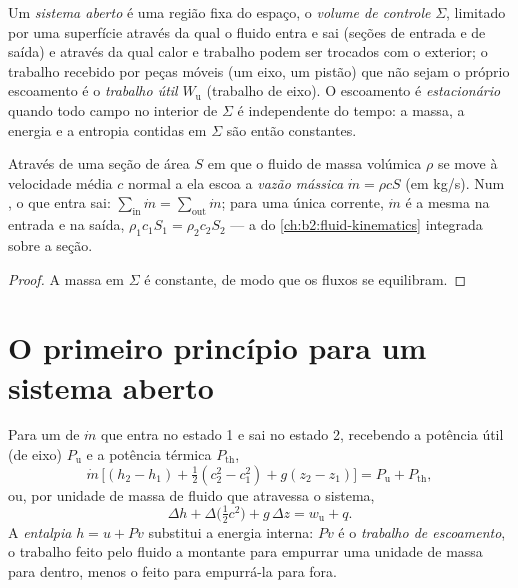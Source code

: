 \begin{definition}\label{def:b2:open-systems:cv}
Um \emph{sistema aberto} é uma região fixa do espaço,
o \emph{volume de controle} $\Sigma$, limitado por uma
superfície através da qual o fluido entra e sai (seções de entrada e de
saída) e através da qual calor e trabalho podem ser trocados com o
exterior; o trabalho recebido por peças móveis (um eixo, um pistão)
que não sejam o próprio escoamento é o \emph{trabalho útil}
$W_{\text{u}}$ (trabalho de eixo). O escoamento é \emph{estacionário} quando todo campo no interior de $\Sigma$ é independente do tempo: a massa,
a energia e a entropia contidas em $\Sigma$ são então constantes.
\end{definition}

\begin{proposition}\label{prop:b2:open-systems:mass}
Através de uma seção de área $S$ em que o fluido de massa volúmica $\rho$ se move
à velocidade média $c$ normal a ela escoa a \emph{vazão
mássica} $\dot m = \rho c S$ (em \unit{kg/s}). Num
, o que entra sai: $\sum_{\text{in}}\dot m = \sum_{\text{out}}
\dot m$; para uma única corrente, $\dot m$ é a mesma na entrada e na saída,
$\rho_1c_1S_1 = \rho_2c_2S_2$ --- a  do
\cref{ch:b2:fluid-kinematics} integrada sobre a seção.
\end{proposition}

\begin{proof}
A massa em $\Sigma$ é constante, de modo que os fluxos se equilibram.
\end{proof}

\section{O primeiro princípio para um sistema aberto}

\begin{theorem}\label{thm:b2:open-systems:firstlaw}
Para um  de  $\dot m$ que entra no estado 1
e sai no estado 2, recebendo a potência útil (de eixo)
$P_{\text{u}}$ e a potência térmica $P_{\text{th}}$,
\[
\dot m\,\Big[(h_2 - h_1) + \tfrac12(c_2^2 - c_1^2) + g(z_2 - z_1)\Big]
= P_{\text{u}} + P_{\text{th}} ,
\]
ou, por unidade de massa de fluido que atravessa o sistema,
\[
\Delta h + \Delta\big(\tfrac12c^2\big) + g\,\Delta z = w_{\text{u}} + q .
\]
A \emph{entalpia} $h = u + Pv$ substitui
a energia interna: $Pv$ é o \emph{trabalho de escoamento}, o trabalho feito pelo
fluido a montante para empurrar uma unidade de massa para dentro, menos o feito para empurrá-la
para fora.
\end{theorem}

